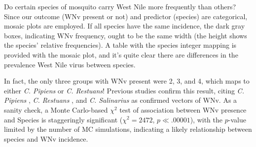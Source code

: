 \documentclass[12pt]{article}
\begin{document}
Do certain species of mosquito carry West Nile more frequently than others? Since our outcome (WNv present or not) and predictor (species) are categorical, mosaic plots are employed. If all species have the same incidence, the dark gray boxes, indicating WNv frequency, ought to be the same width (the height shows the species' relative frequencies). A table with the species integer mapping is provided with the mosaic plot, and it's quite clear there are differences in the prevalence West Nile virus between species.
\begin{singlespace}
\begin{figure}[H]
\begin{floatrow}
 {\caption*{}}
\end{floatrow}
\end{figure}
\end{singlespace}

In fact, the only three groups with WNv present were 2, 3, and 4, which maps to either \emph{C. Pipiens} or \emph{C. Restuans}! Previous studies confirm this result, citing \emph{C. Pipiens} \cite{turell2001vector}, \emph{C. Restuans} \cite{sardelis2001vector}, and \emph{C. Salinarius} \cite{sardelis2001vector} as confirmed vectors of WNv. As a sanity check, a Monte Carlo-based $\chi^2$ test of association between WNv presence and Species is staggeringly significant ($\chi^2 = 2472$, $p \ll .00001$), with the $p$-value limited by the number of MC simulations, indicating a likely relationship between species and WNv incidence.
\end{document}
